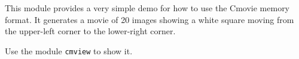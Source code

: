 This module provides a very simple demo for how to use the Cmovie memory
format.
It generates a movie of 20 images showing a white square moving from the
upper-left corner to the lower-right corner.

Use the module \verb+cmview+ to show it.

